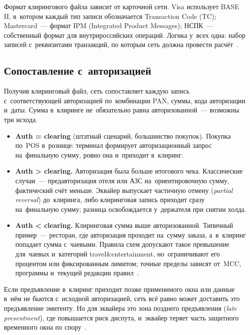 Формат клирингового файла зависит от карточной сети. Visa использует
BASE II, в~котором каждый тип записи обозначается Transaction Code (TC);
Mastercard~--- формат IPM (Integrated Product Messages);
НСПК~--- собственный формат для внутрироссийских операций. Логика
у~всех одна: набор записей с~реквизитами транзакций, по которым сеть
должна провести расчёт~\cite{visa-core-rules,mc-rules}.

\subsection*{Сопоставление с~авторизацией}

Получив клиринговый файл, сеть сопоставляет каждую запись
с~соответствующей авторизацией по~комбинации PAN, суммы, кода
авторизации и~даты. Сумма в~клиринге не~обязательно равна
авторизованной~--- возможны три исхода.

\begin{itemize}
  \item \textbf{Auth = clearing} (штатный сценарий, большинство покупок). Покупка по~POS в~рознице: терминал формирует авторизационный запрос на~финальную сумму, ровно она и~приходит в~клиринг.
  \item \textbf{Auth > clearing.} Авторизация была больше итогового чека. Классические случаи~--- предавторизация отеля или АЗС на~ориентировочную сумму, фактический счёт меньше. Эквайер выпускает частичную отмену (\textit{partial reversal}) до~клиринга, либо клиринговая запись приходит сразу на~финальную сумму; разница освобождается у~держателя при снятии холда.
  \item \textbf{Auth < clearing.} Клиринговая сумма выше авторизованной. Типичный пример~--- ресторан, где авторизация проходит на~сумму заказа, а~в~клиринг попадает сумма с~чаевыми. Правила схем допускают такое превышение для~чаевых и~категорий travel\&entertainment, но~ограничивают его процентом или фиксированным лимитом; точные пределы зависят от~MCC, программы и~текущей редакции правил~\cite{visa-core-rules,mc-rules}.
\end{itemize}

Если предъявление в~клиринг приходит позже применимого окна
или данные в~нём не бьются с~исходной авторизацией, сеть всё равно
может доставить это предъявление эмитенту. Но для эквайера это
зона позднего предъявления (\textit{late presentment}), где повышается риск диспута, и~эквайер теряет
часть защитного временного окна по спору~\cite{visa-core-rules,mc-tpr,mc-chargeback-guide}.


